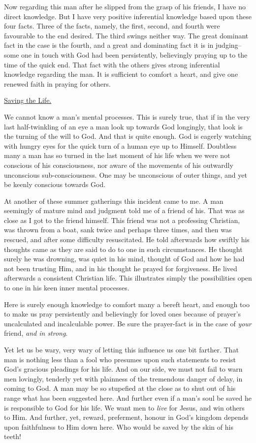 Now regarding this man after he slipped from the grasp of his friends, I
have no direct knowledge. But I have very positive inferential knowledge
based upon these four facts. Three of the facts, namely, the first,
second, and fourth were favourable to the end desired. The third swings
neither way. The great dominant fact in the case is the fourth, and a
great and dominating fact it is in judging--some one in touch with God had
been persistently, believingly praying up to the time of the quick end.
That fact with the others gives strong inferential knowledge regarding the
man. It is sufficient to comfort a heart, and give one renewed faith in
praying for others.



\underline{Saving the Life.}


We cannot know a man's mental processes. This is surely true, that if in
the very last half-twinkling of an eye a man look up towards God
longingly, that look is the turning of the will to God. And that is quite
enough. God is eagerly watching with hungry eyes for the quick turn of a
human eye up to Himself. Doubtless many a man has so turned in the last
moment of his life when we were not conscious of his consciousness, nor
aware of the movements of his outwardly unconscious sub-consciousness. One
may be unconscious of outer things, and yet be keenly conscious towards
God.

At another of these summer gatherings this incident came to me. A man
seemingly of mature mind and judgment told me of a friend of his. That was
as close as I got to the friend himself. This friend was not a professing
Christian, was thrown from a boat, sank twice and perhaps three times, and
then was rescued, and after some difficulty resuscitated. He told
afterwards how swiftly his thoughts came as they are said to do to one in
such circumstances. He thought surely he was drowning, was quiet in his
mind, thought of God and how he had not been trusting Him, and in his
thought he prayed for forgiveness. He lived afterwards a consistent
Christian life. This illustrates simply the possibilities open to one in
his keen inner mental processes.

Here is surely enough knowledge to comfort many a bereft heart, and
enough too to make us pray persistently and believingly for loved ones
because of prayer's uncalculated and incalculable power. Be sure the
prayer-fact is in the case of \textit{your} friend, \textit{and in strong}.

Yet let us be wary, very wary of letting this influence us one bit
farther. That man is nothing less than a fool who presumes upon such
statements to resist God's gracious pleadings for his life. And on our
side, we must not fail to warn men lovingly, tenderly yet with plainness
of the tremendous danger of delay, in coming to God. A man may be so
stupefied at the close as to shut out of his range what has been suggested
here. And further even if a man's soul be saved he is responsible to God
for his life. We want men to \textit{live} for Jesus, and win others to Him. And
further, yet, reward, preferment, honour in God's kingdom depends upon
faithfulness to Him down here. Who would be saved by the skin of his
teeth!

